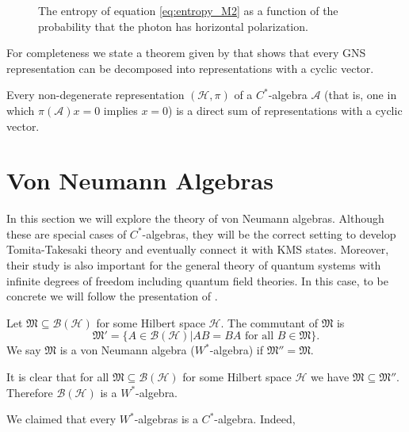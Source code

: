\begin{example}
\begin{figure}
\caption{The entropy of equation \ref{eq:entropy_M2} as a function of the probability that the photon has horizontal polarization.}
\end{figure}
\end{example}

For completeness we state a theorem given by \cite{Bratteli1997} that shows that every GNS representation can be decomposed into representations with a cyclic vector.

\begin{theorem}
Every non-degenerate representation $(\mathcal{H},\pi)$ of a $C^*$-algebra $\mathcal{A}$ (that is, one in which $\pi(\mathcal{A})x={0}$ implies $x=0$) is a direct sum of representations with a cyclic vector. 
\end{theorem}

\section{Von Neumann Algebras}

In this section we will explore the theory of von Neumann algebras. Although these are special cases of $C^*$-algebras, they will be the correct setting to develop Tomita-Takesaki theory and eventually connect it with KMS states. Moreover, their study is also important for the general theory of quantum systems with infinite degrees of freedom including quantum field theories\cite{Haag1992}. In this case, to be concrete we will follow the presentation of \cite{ Evans1998}. 

\begin{definition}
Let $\mathfrak{M}\subseteq \mathcal{B}({\mathcal{H}})$ for some Hilbert space $\mathcal{H}$. The commutant of $\mathfrak{M}$ is
\begin{equation}
\mathfrak{M}'=\{A\in\mathcal{B}(\mathcal{H})|AB=BA\text{ for all } B\in\mathfrak{M}\}.
\end{equation}
We say $\mathfrak{M}$ is a von Neumann algebra ($W^*$-algebra) if $\mathfrak{M}''=\mathfrak{M}$.
\end{definition}

\begin{example}
It is clear that for all $\mathfrak{M}\subseteq\mathcal{B}(\mathcal{H})$ for some Hilbert space $\mathcal{H}$ we have $\mathfrak{M}\subseteq\mathfrak{M}''$. Therefore $\mathcal{B}(\mathcal{H})$ is a $W^*$-algebra.
\end{example}

We claimed that every $W^*$-algebras is a $C^*$-algebra. Indeed,


